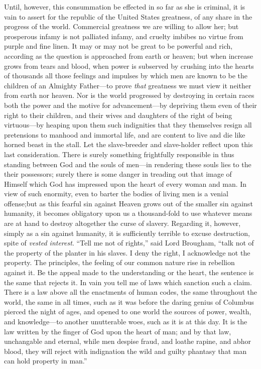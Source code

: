 Until, however, this consummation be effected in so far as she is criminal, it
is vain to assert for the republic of the United States greatness, of any share
in the progress of the world. Commercial greatness we are willing to allow her;
but prosperous infamy is not palliated infamy, and cruelty imbibes no virtue
from purple and fine linen. It may or may not be great to be powerful and rich,
according as the question is approached from earth or heaven; but when increase
grows from tears and blood, when power is subserved by crushing into the hearts
of thousands all those feelings and impulses by which men are known to be the
children of an Almighty Father---to prove \emph{that} greatness we must view it
neither from earth nor heaven. Nor is the world progressed by destroying in
certain races both the power and the motive for advancement---by depriving them
even of their right to their children, and their wives and daughters of the
right of being virtuous---by heaping upon them such indignities that they
themselves resign all pretensions to manhood and immortal life, and are content
to live and die like horned beast in the stall. Let the slave-breeder and
slave-holder reflect upon this last consideration. There is surely something
frightfully responsible in thus standing between God and the souls of men---in
rendering these souls lies to the their possessors; surely there is some danger
in treading out that image of Himself which God has impressed upon the heart of
every woman and man. In view of such enormity, even to barter the bodies of
living men is a venial offense;\msc but as this fearful sin against Heaven grows
out of the smaller sin against humanity, it becomes obligatory upon us
a thousand-fold to use whatever means are at hand to destroy altogether the
curse of slavery. Regarding it, however, simply as a sin against humanity, it is
sufficiently terrible to excuse destruction, spite of \emph{vested interest}.
``Tell me not of rights,'' said Lord Brougham, ``talk not of the property of the
planter in his slaves. I deny the right, I acknowledge not the property. The
principles, the feeling of our common nature rise in rebellion against it. Be
the appeal made to the understanding or the heart, the sentence is the same that
rejects it. In vain you tell me of laws which sanction such a claim. There is
a law above all the enactments of human codes, the same throughout the world,
the same in all times, such as it was before the daring genius of Columbus
pierced the night of ages, and opened to one world the sources of power, wealth,
and knowledge---to another unutterable woes, such as it is at this day. It is
the law written by the finger of God upon the heart of man; and by that law,
unchangable and eternal, while men despise fraud, and loathe rapine, and abhor
blood, they will reject with indignation the wild and guilty phantasy that man
can hold property in man.''

